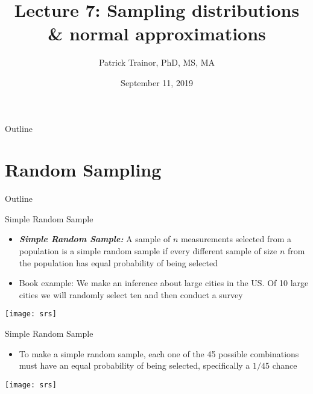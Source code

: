 \documentclass[xcolor=dvipsnames]{beamer}
\title[Lecture 7]{Lecture 7: Sampling distributions \& normal approximations}
\author[Patrick Trainor]{Patrick Trainor, PhD, MS, MA}
\institute[NMSU]{New Mexico State University}
\date{September 11, 2019}
\begin{document}
	
\begin{frame}
	\maketitle
\end{frame}

\begin{frame}{Outline}
	\tableofcontents[hideallsubsections]
\end{frame}

\section{Random Sampling}
\begin{frame}{Outline}
	\tableofcontents[currentsection,subsectionstyle=show/shaded/hide]
\end{frame}

\begin{frame}{Simple Random Sample}
	\begin{itemize}
		\item \textbf{\emph{Simple Random Sample:}} A sample of $n$ measurements selected from a population is a simple random sample if every different sample of size $n$ from the population has equal probability of being selected \pause 
		\item Book example: We make an inference about large cities in the US. Of 10 large cities we will randomly select ten and then conduct a survey \pause 
	\end{itemize}
	\begin{center}
		\texttt{[image: srs]}
	\end{center}
\end{frame}

\begin{frame}{Simple Random Sample}
	\begin{itemize}
		\item To make a simple random sample, each one of the 45 possible combinations must have an equal probability of being selected, specifically a $1/45$ chance 
	\end{itemize}
	\begin{center}
		\texttt{[image: srs]}
	\end{center}
\end{frame}
\end{document}
